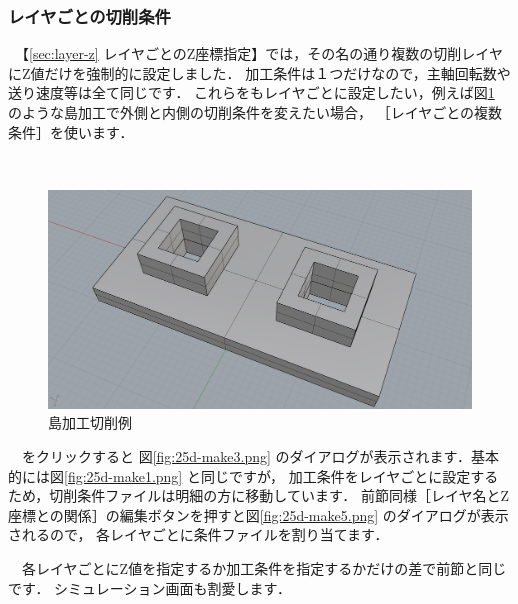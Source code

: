\subsubsection{レイヤごとの切削条件}

\begin{minipage}[t]{0.49\textwidth}
　【\ref{sec:layer-z} レイヤごとのZ座標指定】では，その名の通り複数の切削レイヤにZ値だけを強制的に設定しました．
加工条件は１つだけなので，主軸回転数や送り速度等は全て同じです．
これらをもレイヤごとに設定したい，例えば図\ref{fig:shima-img.png} のような島加工で外側と内側の切削条件を変えたい場合，
［レイヤごとの複数条件］を使います．
\end{minipage}
\begin{minipage}[t]{0.02\textwidth}
　
\end{minipage}
\begin{minipage}[t]{0.49\textwidth}
\vspace*{-2zh}
\begin{figure}[H]
\centering
\includegraphics[width=\textwidth]{No3/fig/shima-img.png}
\caption{島加工切削例}
\label{fig:shima-img.png}
\end{figure}
\end{minipage}

\vspace*{2zh}
　をクリックすると
図\ref{fig:25d-make3.png} のダイアログが表示されます．基本的には図\ref{fig:25d-make1.png} と同じですが，
加工条件をレイヤごとに設定するため，切削条件ファイルは明細の方に移動しています．
前節同様［レイヤ名とZ座標との関係］の編集ボタンを押すと図\ref{fig:25d-make5.png} のダイアログが表示されるので，
各レイヤごとに条件ファイルを割り当てます．

　各レイヤごとにZ値を指定するか加工条件を指定するかだけの差で前節と同じです．
シミュレーション画面も割愛します．

